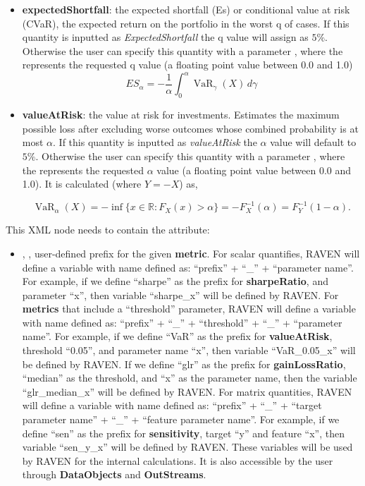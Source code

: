 \begin{itemize}
\begin{itemize}
  \item \textbf{expectedShortfall}: the expected shortfall (Es) or conditional value at risk (CVaR), the expected return on the portfolio in the worst q of cases. If this quantity is inputted as \textit{ExpectedShortfall} the q value will assign as $5\%$. Otherwise the user can specify this quantity with a parameter , where the  represents the requested q value (a floating point value between 0.0 and 1.0)
  \begin{equation}
    ES_\alpha = -\frac{1}{\alpha} \int_0^\alpha \operatorname{VaR}_\gamma(X) \, d\gamma
  \end{equation}
  \item \textbf{valueAtRisk}: the value at risk for investments. Estimates the maximum possible loss after excluding worse outcomes whose combined probability is at most $\alpha$. If this quantity is inputted as \textit{valueAtRisk} the $\alpha$ value will default to $5\%$. Otherwise the user can specify this quantity with a parameter , where the  represents the requested $\alpha$ value (a floating point value between 0.0 and 1.0). It is calculated (where $ Y = -X $) as,

  \begin{equation}
    \operatorname{VaR}_\alpha(X)=-\inf\big\{x\in\mathbb{R}:F_X(x)>\alpha\big\} = -F^{-1}_X(\alpha) = F^{-1}_Y(1-\alpha).
  \end{equation}
  \end{itemize}
  This XML node needs to contain the attribute:
  \begin{itemize}
    \itemsep0em
    \item {}, , user-defined prefix for the given \textbf{metric}.
      For scalar quantifies, RAVEN will define a variable with name defined as:  ``prefix'' + ``\_'' + ``parameter name''.
      For example, if we define ``sharpe'' as the prefix for \textbf{sharpeRatio}, and parameter ``x'', then variable
      ``sharpe\_x'' will be defined by RAVEN. For \textbf{metrics} that include a ``threshold'' parameter,
      RAVEN will define a variable with name defined as: ``prefix'' + ``\_'' + ``threshold'' + ``\_'' + ``parameter name''.
      For example, if we define ``VaR'' as the prefix for \textbf{valueAtRisk}, threshold ``0.05'', and parameter name ``x'',
      then variable ``VaR\_0.05\_x'' will be defined by RAVEN. If we define ``glr'' as the prefix for \textbf{gainLossRatio},
      ``median'' as the threshold, and ``x'' as the parameter name, then the variable ``glr\_median\_x''
      will be defined by RAVEN.
      For matrix quantities, RAVEN will define a variable with name defined as: ``prefix'' + ``\_'' + ``target parameter name'' + ``\_'' + ``feature parameter name''.
      For example, if we define ``sen'' as the prefix for \textbf{sensitivity}, target ``y'' and feature ``x'', then
      variable ``sen\_y\_x'' will be defined by RAVEN.
      \nb These variables will be used by RAVEN for the internal calculations. It is also accessible by the user through
      \textbf{DataObjects} and \textbf{OutStreams}.
  \end{itemize}


\end{itemize}
